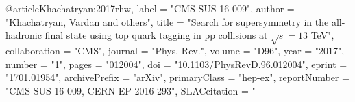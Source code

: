 @article{Khachatryan:2017rhw,
      label          = "CMS-SUS-16-009",
      author         = "Khachatryan, Vardan and others",
      title          = "{Search for supersymmetry in the all-hadronic final state
                        using top quark tagging in pp collisions at $\sqrt s = 13$
                        TeV}",
      collaboration  = "CMS",
      journal        = "Phys. Rev.",
      volume         = "D96",
      year           = "2017",
      number         = "1",
      pages          = "012004",
      doi            = "10.1103/PhysRevD.96.012004",
      eprint         = "1701.01954",
      archivePrefix  = "arXiv",
      primaryClass   = "hep-ex",
      reportNumber   = "CMS-SUS-16-009, CERN-EP-2016-293",
      SLACcitation   = "%
}

